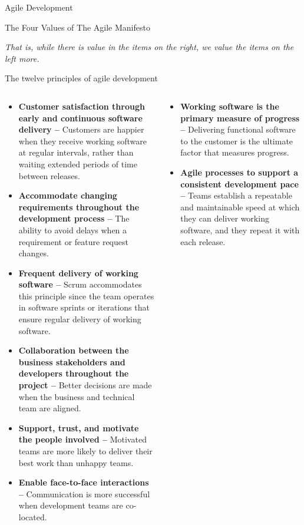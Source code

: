 \documentclass[final,hyperref={pdfpagelabels=false}]{beamer}
\begin{document}
\begin{frame}{Agile Development}
\begin{block}{\large The Four Values of The Agile Manifesto}
\begin{itemize}
        \end{itemize}
        \textit{That is, while there is value in the items on
        the right, we value the items on the left more.}
    \end{block}  
     \begin{block}{\large The twelve principles of agile development}
         \begin{columns}[t]
      \begin{column}{.48\linewidth}
            \begin{itemize}
                \item \textbf{Customer satisfaction through early and continuous software delivery –} Customers are happier when they receive working software at regular intervals, rather than waiting extended periods of time between releases.
                \item \textbf{Accommodate changing requirements throughout the development process – }The ability to avoid delays when a requirement or feature request changes.
                \item \textbf{Frequent delivery of working software – }Scrum accommodates this principle since the team operates in software sprints or iterations that ensure regular delivery of working software.
                \item \textbf{Collaboration between the business stakeholders and developers throughout the project –} Better decisions are made when the business and technical team are aligned.
                \item \textbf{Support, trust, and motivate the people involved –} Motivated teams are more likely to deliver their best work than unhappy teams.
                \item \textbf{Enable face-to-face interactions –} Communication is more successful when development teams are co-located.
            \end{itemize}
            \end{column}
        \begin{column}{.48\linewidth}
            \begin{itemize}
                \item \textbf{Working software is the primary measure of progress –} Delivering functional software to the customer is the ultimate factor that measures progress.
                \item \textbf{Agile processes to support a consistent development pace –} Teams establish a repeatable and maintainable speed at which they can deliver working software, and they repeat it with each release.

\end{itemize}
\end{column}
\end{columns}
\end{block}
\end{frame}
\end{document}
